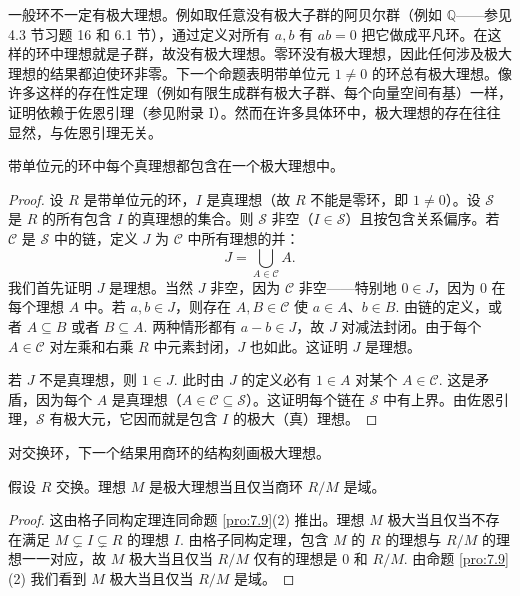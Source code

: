 一般环不一定有极大理想。例如取任意没有极大子群的阿贝尔群（例如 \(\mathbb{Q}\)——参见 4.3 节习题 16 和 6.1 节），通过定义对所有 \(a, b\) 有 \(ab = 0\) 把它做成平凡环。在这样的环中理想就是子群，故没有极大理想。零环没有极大理想，因此任何涉及极大理想的结果都迫使环非零。下一个命题表明带单位元 \(1 \neq 0\) 的环总有极大理想。像许多这样的存在性定理（例如有限生成群有极大子群、每个向量空间有基）一样，证明依赖于佐恩引理（参见附录 I）。然而在许多具体环中，极大理想的存在往往显然，与佐恩引理无关。

\begin{proposition}\label{pro:7.11}
带单位元的环中每个真理想都包含在一个极大理想中。
\end{proposition}

\begin{proof}
设 \(R\) 是带单位元的环，\(I\) 是真理想（故 \(R\) 不能是零环，即 \(1 \neq 0\)）。设 \(\mathcal{S}\) 是 \(R\) 的所有包含 \(I\) 的真理想的集合。则 \(\mathcal{S}\) 非空（\(I \in \mathcal{S}\)）且按包含关系偏序。若 \(\mathcal{C}\) 是 \(\mathcal{S}\) 中的链，定义 \(J\) 为 \(\mathcal{C}\) 中所有理想的并：
\[
J = \bigcup_{A \in \mathcal{C}} A.
\]
我们首先证明 \(J\) 是理想。当然 \(J\) 非空，因为 \(\mathcal{C}\) 非空——特别地 \(0 \in J\)，因为 0 在每个理想 \(A\) 中。若 \(a, b \in J\)，则存在 \(A, B \in \mathcal{C}\) 使 \(a \in A\)、\(b \in B\). 由链的定义，或者 \(A \subseteq B\) 或者 \(B \subseteq A\). 两种情形都有 \(a - b \in J\)，故 \(J\) 对减法封闭。由于每个 \(A \in \mathcal{C}\) 对左乘和右乘 \(R\) 中元素封闭，\(J\) 也如此。这证明 \(J\) 是理想。

若 \(J\) 不是真理想，则 \(1 \in J\). 此时由 \(J\) 的定义必有 \(1 \in A\) 对某个 \(A \in \mathcal{C}\). 这是矛盾，因为每个 \(A\) 是真理想（\(A \in \mathcal{C} \subseteq \mathcal{S}\)）。这证明每个链在 \(\mathcal{S}\) 中有上界。由佐恩引理，\(\mathcal{S}\) 有极大元，它因而就是包含 \(I\) 的极大（真）理想。
\end{proof}

对交换环，下一个结果用商环的结构刻画极大理想。

\begin{proposition}\label{pro:7.12}
假设 \(R\) 交换。理想 \(M\) 是极大理想当且仅当商环 \(R/M\) 是域。
\end{proposition}

\begin{proof}
这由格子同构定理连同命题 \ref{pro:7.9}(2) 推出。理想 \(M\) 极大当且仅当不存在满足 \(M \subsetneq I \subsetneq R\) 的理想 \(I\). 由格子同构定理，包含 \(M\) 的 \(R\) 的理想与 \(R/M\) 的理想一一对应，故 \(M\) 极大当且仅当 \(R/M\) 仅有的理想是 0 和 \(R/M\). 由命题 \ref{pro:7.9}(2) 我们看到 \(M\) 极大当且仅当 \(R/M\) 是域。
\end{proof}

